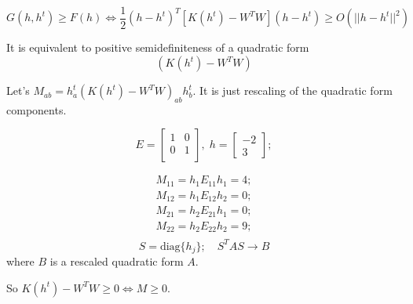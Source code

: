 \documentclass[oneside, final, 14pt]{extarticle}
\begin{document}
$$G(h,h^t) \geqslant F(h) \iff
\frac{1}{2} (h - h^t)^T \left[K(h^t) - W^TW\right] (h - h^t)
\geqslant O(||h - h^t||^2)$$

It is equivalent to positive semidefiniteness of a quadratic form
$$(K(h^t) - W^TW)$$

Let's $M_{ab} = h_a^t (K(h^t) - W^T W)_{ab} h_b^t$.
It is just rescaling of the quadratic form components.

\[
  E =
  \begin{bmatrix}
    1 & 0 \\
    0 & 1 \\
  \end{bmatrix}, \;
  h = \begin{bmatrix} -2 \\ 3 \end{bmatrix};
\]

\begin{align*}
  M_{11} = h_1 E_{11} h_1 = 4; \\
  M_{12} = h_1 E_{12} h_2 = 0; \\
  M_{21} = h_2 E_{21} h_1 = 0; \\
  M_{22} = h_2 E_{22} h_2 = 9; \\
\end{align*}
$$ S = \text{diag}\{h_j\}; \quad S^T A S \rightarrow B$$
where $B$ is a rescaled quadratic form $A$.

So $K(h^t) - W^TW \geqslant 0 \iff M \geqslant 0$.
\end{document}
